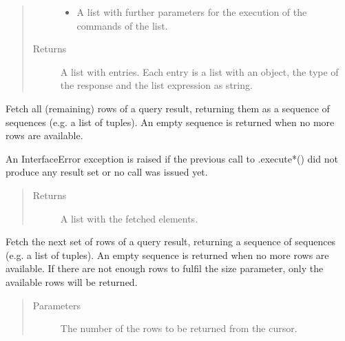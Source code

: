 \documentclass[letterpaper,10pt,english]{sphinxmanual}
\begin{document}
\begin{fulllineitems}
\begin{fulllineitems}
\begin{quote}
\begin{description}
\begin{itemize}
\item {} 
 \textendash{} A list with further parameters for the execution of the commands of the list.

\end{itemize}

\item[{Returns}] \leavevmode
A list with entries. Each entry is a list with an  object, the type of the response and the list
expression as string.

\end{description}\end{quote}

\end{fulllineitems}


\begin{fulllineitems}
\label{\detokenize{index:secondodb.api.secondoapi.Cursor.fetchall}}
Fetch all (remaining) rows of a query result, returning them as a sequence of sequences (e.g. a list of tuples).
An empty sequence is returned when no more rows are available.

An InterfaceError exception is raised if the previous call to .execute*() did not produce any result set or
no call was issued yet.
\begin{quote}\begin{description}
\item[{Returns}] \leavevmode
A list with the fetched elements.

\end{description}\end{quote}

\end{fulllineitems}


\begin{fulllineitems}
\label{\detokenize{index:secondodb.api.secondoapi.Cursor.fetchmany}}
Fetch the next set of rows of a query result, returning a sequence of sequences (e.g. a list of tuples). An
empty sequence is returned when no more rows are available. If there are not enough rows to fulfil the size
parameter, only the available rows will be returned.
\begin{quote}\begin{description}
\item[{Parameters}] \leavevmode
{} \textendash{} The number of the rows to be returned from the cursor.


\end{description}
\end{quote}
\end{fulllineitems}
\end{fulllineitems}
\end{document}
